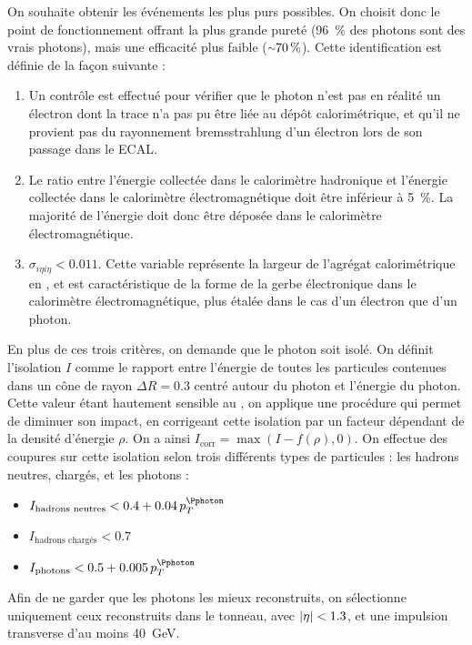 On souhaite obtenir les événements les plus purs possibles. On choisit donc le point de fonctionnement offrant la plus grande pureté (\tilde\SI{96}{\%} des photons sont des vrais photons), mais une efficacité plus faible ($\tilde \SI{70}{\%}$). Cette identification est définie de la façon suivante :

\begin{enumerate}
    \item Un contrôle est effectué pour vérifier que le photon n'est pas en réalité un électron dont la trace n'a pas pu être liée au dépôt calorimétrique, et qu'il ne provient pas du rayonnement bremsstrahlung d'un électron lors de son passage dans le ECAL.
    \item Le ratio entre l'énergie collectée dans le calorimètre hadronique et l'énergie collectée dans le calorimètre électromagnétique doit être inférieur à \SI{5}{\%}. La majorité de l'énergie doit donc être déposée dans le calorimètre électromagnétique.
    \item $\sigma_{i\eta i\eta} < \num{0.011}$. Cette variable représente la largeur de l'agrégat calorimétrique en \aeta, et est caractéristique de la forme de la gerbe électronique dans le calorimètre électromagnétique, plus étalée dans le cas d'un électron que d'un photon.
\end{enumerate}

En plus de ces trois critères, on demande que le photon soit isolé. On définit l'isolation $I$ comme le rapport entre l'énergie de toutes les particules \pf contenues dans un cône de rayon $\Delta R = \num{0.3}$ centré autour du photon et l'énergie du photon. Cette valeur étant hautement sensible au \pu, on applique une procédure qui permet de diminuer son impact, en corrigeant cette isolation par un facteur dépendant de la densité d'énergie $\rho$. On a ainsi $I_\text{corr} = \max{\left(I - f(\rho), 0\right)}$. On effectue des coupures sur cette isolation selon trois différents types de particules : les hadrons neutres, chargés, et les photons :

\begin{itemize}
    \item $I_\text{hadrons neutres} < \num{0.4} + \num{0.04} \, p_T^{\Pphoton}$
    \item $I_\text{hadrons chargés} < \num{0.7}$
    \item $I_\text{photons} < \num{0.5} + \num{0.005} \, p_T^{\Pphoton}$
\end{itemize}

Afin de ne garder que les photons les mieux reconstruits, on sélectionne uniquement ceux reconstruits dans le tonneau, avec $\lvert \eta \rvert < \num{1.3}$, et une impulsion transverse d'au moins \SI{40}{\GeV}.

